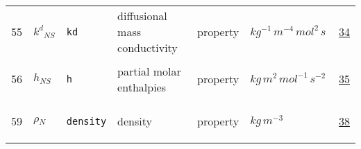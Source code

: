 \begin{longtable}{|p{1cm}|p{2.5cm}|p{4.5cm}|p{8cm}|p{3.0cm}|p{3cm}|p{1cm}|}
            55
             & \hypertarget{"v:55"}{ $ {{k^d}}{_{{N S}}} $}
             & \verb|kd|
             & diffusional mass conductivity
             & \begin{lay}property \end{lay}
             & $ kg^{-1} \,m^{-4} \,mol^{2} \,s \, $
             &                 \hyperlink{"e:34"}{ 34 }
                 \\
            56
             & \hypertarget{"v:56"}{ $ {h}{_{{N S}}} $}
             & \verb|h|
             & partial molar enthalpies
             & \begin{lay}property \end{lay}
             & $ kg \,m^{2} \,mol^{-1} \,s^{-2} \, $
             &                 \hyperlink{"e:35"}{ 35 }
                 \\
            59
             & \hypertarget{"v:59"}{ $ {\rho}{_{N}} $}
             & \verb|density|
             & density
             & \begin{lay}property \end{lay}
             & $ kg \,m^{-3} \, $
             &                 \hyperlink{"e:38"}{ 38 }
                 \\
    \end{longtable}